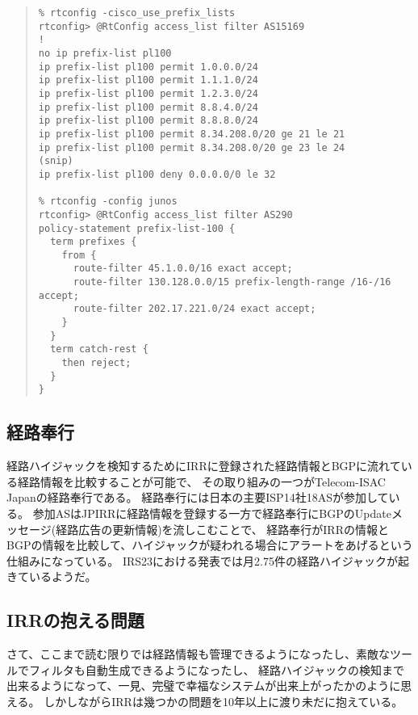 \begin{quote}
\begin{minilinespace}
\begin{verbatim}
% rtconfig -cisco_use_prefix_lists
rtconfig> @RtConfig access_list filter AS15169
!
no ip prefix-list pl100
ip prefix-list pl100 permit 1.0.0.0/24
ip prefix-list pl100 permit 1.1.1.0/24
ip prefix-list pl100 permit 1.2.3.0/24
ip prefix-list pl100 permit 8.8.4.0/24
ip prefix-list pl100 permit 8.8.8.0/24
ip prefix-list pl100 permit 8.34.208.0/20 ge 21 le 21
ip prefix-list pl100 permit 8.34.208.0/20 ge 23 le 24
(snip)
ip prefix-list pl100 deny 0.0.0.0/0 le 32

% rtconfig -config junos
rtconfig> @RtConfig access_list filter AS290
policy-statement prefix-list-100 {
  term prefixes {
    from {
      route-filter 45.1.0.0/16 exact accept;
      route-filter 130.128.0.0/15 prefix-length-range /16-/16 accept;
      route-filter 202.17.221.0/24 exact accept;
    }
  }
  term catch-rest {
    then reject;
  }
}
\end{verbatim}
\end{minilinespace}
\end{quote}

\newpage

\subsection{経路奉行}

経路ハイジャックを検知するためにIRRに登録された経路情報とBGPに流れている経路情報を比較することが可能で、
その取り組みの一つがTelecom-ISAC Japanの経路奉行である。
経路奉行には日本の主要ISP14社18ASが参加している。
参加ASはJPIRRに経路情報を登録する一方で経路奉行にBGPのUpdateメッセージ(経路広告の更新情報)を流しこむことで、
経路奉行がIRRの情報とBGPの情報を比較して、ハイジャックが疑われる場合にアラートをあげるという仕組みになっている。
IRS23における発表では月2.75件の経路ハイジャックが起きているようだ。

\subsection{IRRの抱える問題}

さて、ここまで読む限りでは経路情報も管理できるようになったし、素敵なツールでフィルタも自動生成できるようになったし、
経路ハイジャックの検知まで出来るようになって、一見、完璧で幸福なシステムが出来上がったかのように思える。
しかしながらIRRは幾つかの問題を10年以上に渡り未だに抱えている。

